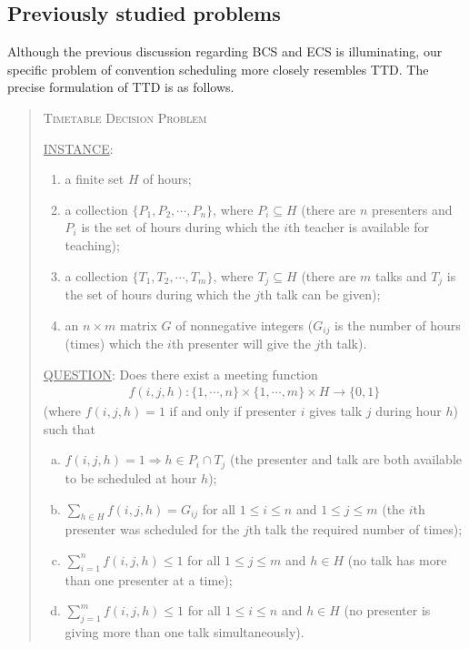 \documentclass[]{article}
\theoremstyle{definition}
\theoremstyle{remark}
\numberwithin{equation}{section}
\begin{document}
\subsection{Previously studied problems}
Although the previous discussion regarding BCS and ECS is illuminating, our specific problem of convention scheduling more closely resembles TTD. The precise formulation of TTD is as follows.
\begin{quote}
	\textsc{Timetable Decision Problem}
	
	\underline{INSTANCE}:
	\begin{enumerate}
		\item a finite set $H$ of hours;
		\item a collection $\{P_1, P_2, \cdots, P_n\}$, where $P_i \subseteq H$ (there are $n$ presenters and $P_i$ is the set of hours during which the $i$th teacher is available for teaching);
		\item a collection $\{T_1, T_2, \cdots, T_m\}$, where $T_j \subseteq H$ (there are $m$ talks and $T_j$ is the set of hours during which the $j$th talk can be given);
		\item an $n \times m$ matrix $G$ of nonnegative integers ($G_{ij}$ is the number of hours (times) which the $i$th presenter will give the $j$th talk).
	\end{enumerate}
	\underline{QUESTION}: Does there exist a meeting function 
	\begin{gather*}
		f(i,j,h) : \{1,\cdots,n\} \times \{1,\cdots,m\} \times H \rightarrow \{0,1\}
	\end{gather*}
	(where $f(i,j,h)=1$ if and only if presenter $i$ gives talk $j$ during hour $h$) such that
	\begin{enumerate}[(a)]
		\item $f(i,j,h) = 1 \Rightarrow h \in P_i \cap T_j$ (the presenter and talk are both available to be scheduled at hour $h$);
		\item $\sum\limits_{h \in H} f(i,j,h) = G_{ij}$ for all $1 \le i \le n$ and $1 \le j \le m$ (the $i$th presenter was scheduled for the $j$th talk the required number of times);
		\item $\sum\limits_{i=1}^n f(i,j,h) \le 1$ for all $1 \le j \le m$ and $h \in H$ (no talk has more than one presenter at a time);
		\item $\sum\limits_{j=1}^m f(i,j,h) \le 1$ for all $1 \le i \le n$ and $h \in H$ (no presenter is giving more than one talk simultaneously).
	\end{enumerate}
\end{quote}
\end{document}
